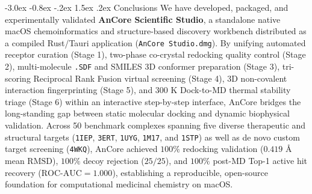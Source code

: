 \documentclass[11pt,a4paper]{article}
\makeatletter
\renewcommand{\section}{\@startsection{section}{1}{\z@}%
  {-3.0ex \@plus -0.8ex \@minus -.2ex}%
  {1.5ex \@plus.2ex}%
  {\normalfont\Large\bfseries\color{primary}}}
\makeatother
\begin{document}
\section{Conclusions}
\noindent We have developed, packaged, and experimentally validated \textbf{AnCore Scientific Studio}, a standalone native macOS chemoinformatics and structure-based discovery workbench distributed as a compiled Rust/Tauri application (\texttt{AnCore Studio.dmg}). By unifying automated receptor curation (Stage 1), two-phase co-crystal redocking quality control (Stage 2), multi-molecule \texttt{.SDF} and SMILES 3D conformer preparation (Stage 3), tri-scoring Reciprocal Rank Fusion virtual screening (Stage 4), 3D non-covalent interaction fingerprinting (Stage 5), and $300\text{ K}$ Dock-to-MD thermal stability triage (Stage 6) within an interactive step-by-step interface, AnCore bridges the long-standing gap between static molecular docking and dynamic biophysical validation. Across 50 benchmark complexes spanning five diverse therapeutic and structural targets (\texttt{1IEP}, \texttt{3ERT}, \texttt{1UYG}, \texttt{1M17}, and \texttt{1STP}) as well as de novo custom target screening (\texttt{4WKQ}), AnCore achieved $100\%$ redocking validation ($0.419\text{ \AA}$ mean $\text{RMSD}$), $100\%$ decoy rejection ($25/25$), and $100\%$ post-MD Top-1 active hit recovery ($\text{ROC-AUC} = 1.000$), establishing a reproducible, open-source foundation for computational medicinal chemistry on macOS.
\end{document}
